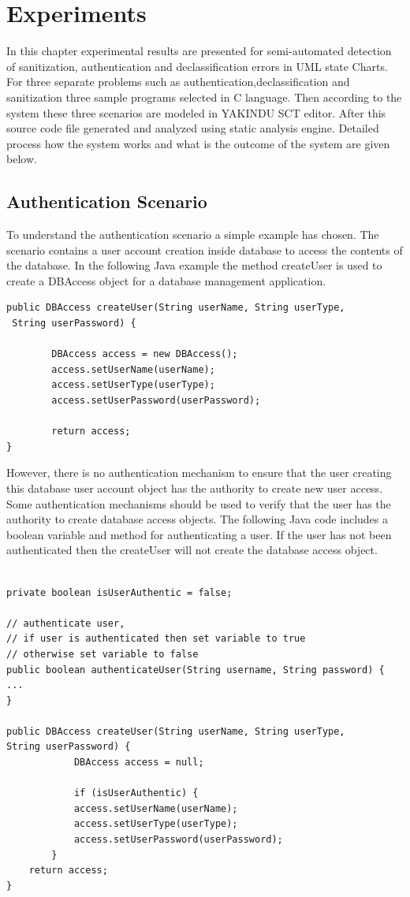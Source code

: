 \chapter{Experiments}
In this chapter experimental results are presented for semi-automated detection of sanitization, authentication and declassification errors in UML state Charts. For three separate problems such as authentication,declassification and sanitization three sample programs selected in C language. Then according to the system these three scenarios are modeled in YAKINDU SCT editor. After this source code file generated and analyzed using static analysis engine. Detailed process how the system works and what is the outcome of the system are given below.

\section{Authentication Scenario}

To understand the authentication scenario a simple example has chosen. The scenario contains a user account creation inside database to access the contents of the database. In the following Java example the method createUser is used to create a DBAccess object for a database management application.

\begin{lstlisting}
public DBAccess createUser(String userName, String userType,
 String userPassword) {

		DBAccess access = new DBAccess();
		access.setUserName(userName);
		access.setUserType(userType);
		access.setUserPassword(userPassword);	
				
		return access;
}

\end{lstlisting}

However, there is no authentication mechanism to ensure that the user creating this database user account object has the authority to create new user access. Some authentication mechanisms should be used to verify that the user has the authority to create database access objects.
The following Java code includes a boolean variable and method for authenticating a user. If the user has not been authenticated then the createUser will not create the database access object.

\begin{lstlisting}

private boolean isUserAuthentic = false;

// authenticate user,
// if user is authenticated then set variable to true
// otherwise set variable to false
public boolean authenticateUser(String username, String password) {
...
}

public DBAccess createUser(String userName, String userType,
String userPassword) {
			DBAccess access = null;
			
			if (isUserAuthentic) {
			access.setUserName(userName);
			access.setUserType(userType);
			access.setUserPassword(userPassword);
		}
	return access;
}
\end{lstlisting}


